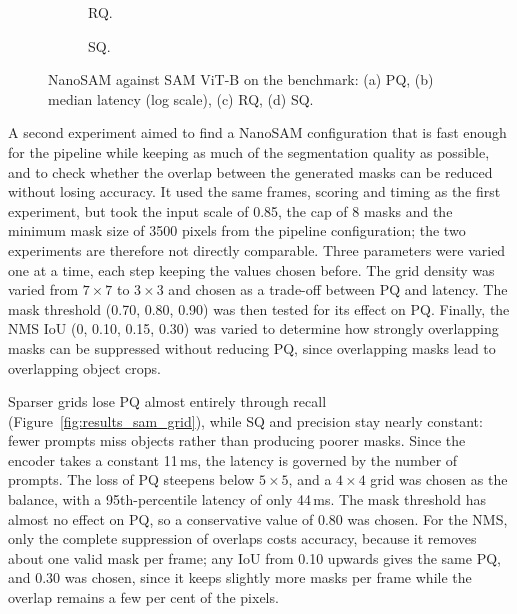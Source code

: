 \begin{figure}[!htb]
\begin{subfigure}[t]{0.24\linewidth}
		\caption{RQ.}
		\label{fig:results_sam_backend_rq}
	\end{subfigure}
	\hfill
	\begin{subfigure}[t]{0.24\linewidth}
		\centering
		\caption{SQ.}
		\label{fig:results_sam_backend_sq}
	\end{subfigure}

	\vspace{1mm}
	\caption{NanoSAM against SAM ViT-B on the benchmark: (a) PQ, (b) median latency (log scale), (c) RQ, (d) SQ.}
	\label{fig:results_sam_backend}
\end{figure}

{\small A second experiment aimed to find a NanoSAM configuration that is fast enough for the pipeline while keeping as much of the segmentation quality as possible, and to check whether the overlap between the generated masks can be reduced without losing accuracy. It used the same frames, scoring and timing as the first experiment, but took the input scale of 0.85, the cap of 8 masks and the minimum mask size of 3500 pixels from the pipeline configuration; the two experiments are therefore not directly comparable. Three parameters were varied one at a time, each step keeping the values chosen before. The grid density was varied from $7 \times 7$ to $3 \times 3$ and chosen as a trade-off between PQ and latency. The mask threshold (0.70, 0.80, 0.90) was then tested for its effect on PQ. Finally, the NMS IoU (0, 0.10, 0.15, 0.30) was varied to determine how strongly overlapping masks can be suppressed without reducing PQ, since overlapping masks lead to overlapping object crops.\par}

{\small Sparser grids lose PQ almost entirely through recall (Figure~\ref{fig:results_sam_grid}), while SQ and precision stay nearly constant: fewer prompts miss objects rather than producing poorer masks. Since the encoder takes a constant 11\,ms, the latency is governed by the number of prompts. The loss of PQ steepens below $5 \times 5$, and a $4 \times 4$ grid was chosen as the balance, with a 95th-percentile latency of only 44\,ms. The mask threshold has almost no effect on PQ, so a conservative value of 0.80 was chosen. For the NMS, only the complete suppression of overlaps costs accuracy, because it removes about one valid mask per frame; any IoU from 0.10 upwards gives the same PQ, and 0.30 was chosen, since it keeps slightly more masks per frame while the overlap remains a few per cent of the pixels.\par}

